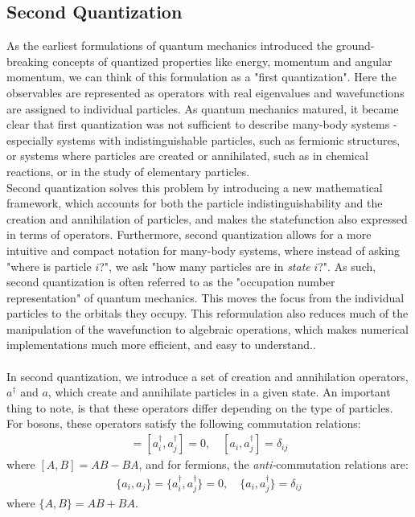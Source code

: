 \documentclass{subfiles}
\begin{document}
\subsection{Second Quantization}
As the earliest formulations of quantum mechanics introduced the ground-breaking concepts of quantized properties like energy, momentum and angular momentum, we can think of this formulation as a "first quantization". Here the observables are represented as operators with real eigenvalues and wavefunctions are assigned to individual particles.
As quantum mechanics matured, it became clear that first quantization was not sufficient to describe many-body systems - especially systems with indistinguishable particles, such as fermionic structures, or systems where particles are created or annihilated, such as in chemical reactions, or in the study of elementary particles.\\  
Second quantization solves this problem by introducing a new mathematical framework, which accounts for both the particle indistinguishability and the creation and annihilation of particles, and makes the statefunction also expressed in terms of operators. Furthermore, second quantization allows for a more intuitive and compact notation for many-body systems, where instead of asking "where is particle $i$?", we ask "how many particles are in \emph{state} $i$?". 
As such, second quantization is often referred to as the "occupation number representation" of quantum mechanics. This moves the focus from the individual particles to the orbitals they occupy. This reformulation also reduces much of the manipulation of the wavefunction to algebraic operations, which makes numerical implementations much more efficient, and easy to understand.\cite{helgaker2013molecular}.
\\ \\ In second quantization, we introduce a set of creation and annihilation operators, $a^\dagger$ and $a$, which create and annihilate particles in a given state. An important thing to note, is that these operators differ depending on the type of particles. For bosons, these operators satisfy the following commutation relations:
\begin{align}
    [a_i, a_j] = [a^\dagger_i, a^\dagger_j] = 0, \quad [a_i, a^\dagger_j] = \delta_{ij}\label{eq:commutation}
\end{align}
where $[A, B] = AB - BA$, and for fermions, the \emph{anti-}commutation relations are:
\begin{align}
    \{a_i, a_j\} = \{a^\dagger_i, a^\dagger_j\} = 0, \quad \{a_i, a^\dagger_j\} = \delta_{ij}\label{eq:anti_commutation}
\end{align}
where $\{A, B\} = AB + BA$.
\end{document}
